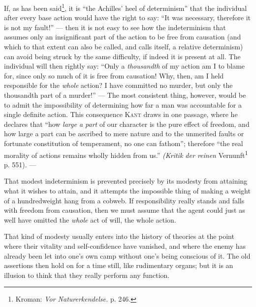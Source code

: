 \documentclass[12pt,a4paper,openany]{book}
\newcommand{\opage}[1]{\marginnote{\footnotesize\textit{[#1]}}}
\begin{document}
If, as has been said\footnote[1]{Kroman: \textit{Vor Naturerkendelse.} p. 246.}, it is ``the Achilles'
heel of determinism'' that the individual after every base action would have the right to say: ``It was
necessary, therefore it is not my fault!'' --- then it is not easy to see how the indeterminism that
assumes only an insignificant part of the action to be free from causation (and which to that extent
can also be called, and calls itself, a relative determinism) can avoid being struck by the same
difficulty, if indeed it is present at all. The individual will then rightly say: ``Only a
\textit{thousandth} of my action am I to blame for, since only so much of it is free from causation! Why,
then, am I held responsible for the \textit{whole} action? I have committed no murder, but only the
thousandth part of a murder!'' --- The most consistent thing, however, would be to admit the
impossibility of determining how far a man was accountable for a single definite action. This
consequence \textsc{Kant} draws in one passage, where he declares that ``how \textit{large a part} of our
character is the pure effect of freedom, and how large a part can be ascribed to mere nature and to the
unmerited faults or fortunate constitution of temperament, no one can fathom''; therefore ``the real
morality of actions remains wholly hidden from us.'' \textit{(Kritik der reinen}
Vernunft\textsuperscript{1} p. 551). ---

That modest indeterminism is prevented precisely by its modesty from attaining what it wishes to attain,
and it attempts
\opage{117}the impossible thing of making a weight of a hundredweight hang from a cobweb. If responsibility really
stands and falls with freedom from causation, then we must assume that the agent could just as well have
omitted the \textit{whole} act of will, the whole action.

That kind of modesty usually enters into the history of theories at the point where their vitality and
self-confidence have vanished, and where the enemy has already been let into one's own camp without one's
being conscious of it. The old assertions then hold on for a time still, like rudimentary organs; but it
is an illusion to think that they really perform any function.
\end{document}
